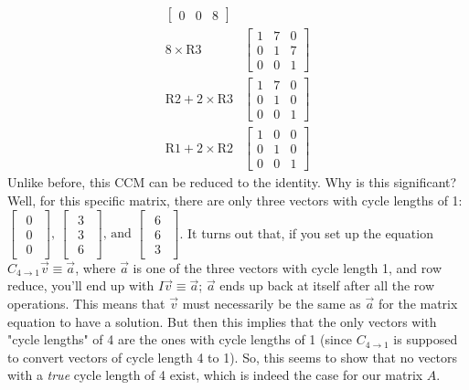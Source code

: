 \documentclass[a4paper, reqno, 12pt]{amsart}
\begin{document}
\begin{align*}
\begin{bmatrix}
			0 & 0 & 8
		\end{bmatrix} \\
		8 \times \text{R}3 &
		\begin{bmatrix}
			1 & 7 & 0 \\
			0 & 1 & 7 \\
			0 & 0 & 1
		\end{bmatrix} \\
		\text{R}2 + 2 \times \text{R}3 &
		\begin{bmatrix}
			1 & 7 & 0 \\
			0 & 1 & 0 \\
			0 & 0 & 1
		\end{bmatrix} \\
		\text{R}1 + 2 \times \text{R}2 &
		\begin{bmatrix}
			1 & 0 & 0 \\
			0 & 1 & 0 \\
			0 & 0 & 1
		\end{bmatrix}
	\end{align*}
	Unlike before, this CCM can be reduced to the identity. Why is this significant? Well, for this specific matrix, there are only three vectors with cycle lengths of
	1: $
	\begin{bmatrix}
		\begin{smallmatrix}
			0 \\
			0 \\
			0
		\end{smallmatrix}
	\end{bmatrix}, \, 
	\begin{bmatrix}
		\begin{smallmatrix}
			3 \\
			3 \\
			6
		\end{smallmatrix}
	\end{bmatrix}, \, \text{and }
	\begin{bmatrix}
		\begin{smallmatrix}
			6 \\
			6 \\
			3
		\end{smallmatrix}
	\end{bmatrix}$. It turns out that, if you set up the equation $C_{4 \rightarrow 1}\vec{v} \equiv \vec{a}$, where $\vec{a}$ is one of the three vectors with cycle length
	1, and row reduce, you'll end up with $I\vec{v} \equiv \vec{a}$; $\vec{a}$ ends up back at itself after all the row operations. This means that $\vec{v}$ must necessarily
	be the same as $\vec{a}$ for the matrix equation to have a solution. But then this implies that the only vectors with "cycle lengths" of 4 are the ones with cycle
	lengths of 1 (since $C_{4 \rightarrow 1}$ is supposed to convert vectors of cycle length 4 to 1). So, this seems to show that no vectors with a \emph{true} cycle length
	of 4 exist, which is indeed the case for our matrix $A$.
	
\end{document}
